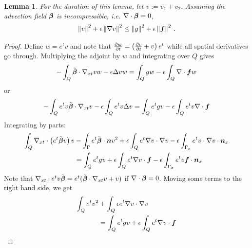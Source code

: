 \documentclass{article}
\newtheorem{lemma}[theorem]{Lemma}
\theoremstyle{definition}
\theoremstyle{remark}
\begin{document}
\begin{lemma}
\label{lem:l2}
For the duration of this lemma, let $v:=v_1+v_2$.
Assuming the advection field $\boldsymbol\beta$ is incompressible, i.e. $\nabla\cdot\boldsymbol\beta=0$,
\[
\left\| v \right\|^2+\epsilon\left\| \nabla v \right\|^2\leq\left\| g \right\|^2+\epsilon\left\| \boldsymbol f \right\|^2\,.
\]
\end{lemma}
\begin{proof}
Define $w=e^{t}v$ and note that $\frac{\partial w}{\partial t}=\left( \frac{\partial v}{\partial t}+v \right)e^{t}$ while
all spatial derivatives go through.
Multiplying the adjoint by $w$ and integrating over $Q$ gives
\begin{align*}
-\int_Q\tilde{\boldsymbol\beta}\cdot\nabla_{xt} vw-\epsilon\Delta vw=\int_Qgw-\epsilon\int_Q\nabla\cdot\boldsymbol f w
\end{align*}
or
\begin{align*}
-\int_Qe^{t}v\tilde{\boldsymbol\beta}\cdot\nabla_{xt} v-\epsilon\int_Q e^{t}v\Delta v=\int_Qe^{t}gv-\epsilon\int_Qe^{t}v\nabla\cdot\boldsymbol f
\end{align*}
Integrating by parts:
\begin{align*}
\int_Q\nabla_{xt}\cdot\left( e^{t}\tilde{\boldsymbol\beta} v \right)v&
-\int_\Gamma e^{t}\tilde{\boldsymbol\beta}\cdot\boldsymbol n v^2
+\epsilon\int_Qe^{t}\nabla v\cdot\nabla v
-\epsilon\int_{\Gamma_x}e^{t}v\cdot\nabla v\cdot\boldsymbol n_x
\\
&=
\int_Qe^{t}gv
+\epsilon\int_Qe^{t}\nabla v\cdot\boldsymbol f
-\epsilon\int_{\Gamma_x}e^{t}v\boldsymbol f\cdot\boldsymbol n_x
\end{align*}
Note that $\nabla_{xt}\cdot{e^{t}v\tilde{\boldsymbol\beta}}=e^{t}(\tilde{\boldsymbol\beta}\cdot\nabla_{xt} v+v)$ if $\nabla\cdot\boldsymbol\beta=0$.
Moving some terms to the right hand side, we get
\begin{align*}
\int_Q e^{t}v^2
&+\int_Q\epsilon e^{t}\Grad v\cdot\Grad v
\\
&=
\int_Qe^{t}gv
+\epsilon\int_Qe^{t}\Grad v\cdot\bff

\end{align*}
\end{proof}
\end{document}
